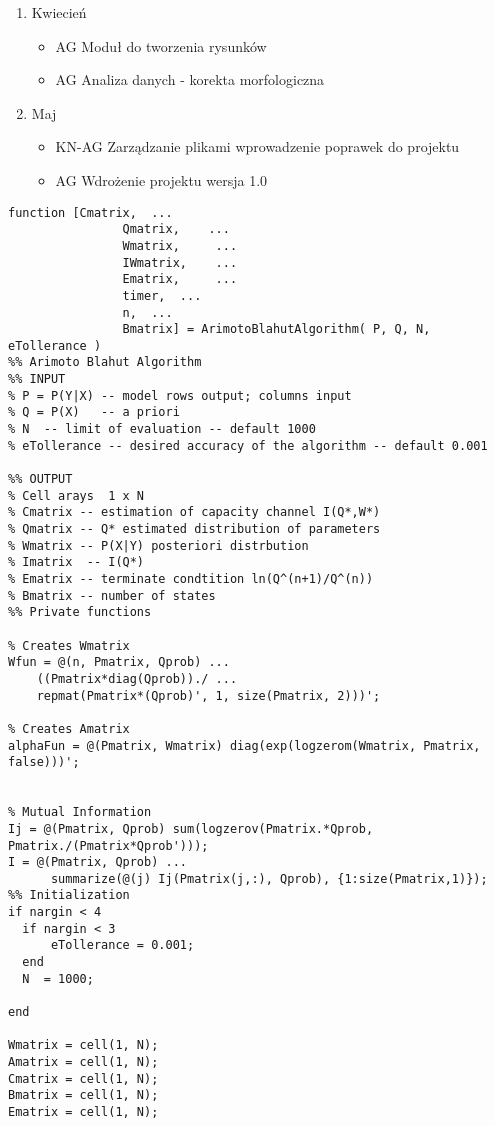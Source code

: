 \begin{enumerate}
\begin{itemize}
\end{itemize}
\item Kwiecień
\begin{itemize}
\item AG Moduł do tworzenia rysunków
\item AG Analiza danych - korekta morfologiczna
\end{itemize}
\item Maj
\begin{itemize}
\item KN-AG Zarządzanie plikami wprowadzenie poprawek do projektu
\item AG Wdrożenie projektu wersja 1.0
\end{itemize}
\end{enumerate}

\begin{lstlisting}
function [Cmatrix, 	...
             	Qmatrix, 	...
              	Wmatrix,	 ...
               	IWmatrix,	 ...
               	Ematrix,	 ...
               	timer,	...
               	n, 	...
               	Bmatrix] = ArimotoBlahutAlgorithm( P, Q, N, eTollerance )
%% Arimoto Blahut Algorithm
%% INPUT
% P = P(Y|X) -- model rows output; columns input
% Q = P(X)   -- a priori
% N  -- limit of evaluation -- default 1000
% eTollerance -- desired accuracy of the algorithm -- default 0.001

%% OUTPUT 
% Cell arays  1 x N
% Cmatrix -- estimation of capacity channel I(Q*,W*)
% Qmatrix -- Q* estimated distribution of parameters
% Wmatrix -- P(X|Y) posteriori distrbution
% Imatrix  -- I(Q*)
% Ematrix -- terminate condtition ln(Q^(n+1)/Q^(n))
% Bmatrix -- number of states
%% Private functions

% Creates Wmatrix 
Wfun = @(n, Pmatrix, Qprob) ...
    ((Pmatrix*diag(Qprob))./ ...
    repmat(Pmatrix*(Qprob)', 1, size(Pmatrix, 2)))';

% Creates Amatrix
alphaFun = @(Pmatrix, Wmatrix) diag(exp(logzerom(Wmatrix, Pmatrix, false)))';


% Mutual Information
Ij = @(Pmatrix, Qprob) sum(logzerov(Pmatrix.*Qprob, Pmatrix./(Pmatrix*Qprob')));
I = @(Pmatrix, Qprob) ...
      summarize(@(j) Ij(Pmatrix(j,:), Qprob), {1:size(Pmatrix,1)});
%% Initialization
if nargin < 4
  if nargin < 3
      eTollerance = 0.001;
  end
  N  = 1000;
  
end

Wmatrix = cell(1, N);
Amatrix = cell(1, N);
Cmatrix = cell(1, N);
Bmatrix = cell(1, N);
Ematrix = cell(1, N);


\end{lstlisting}
